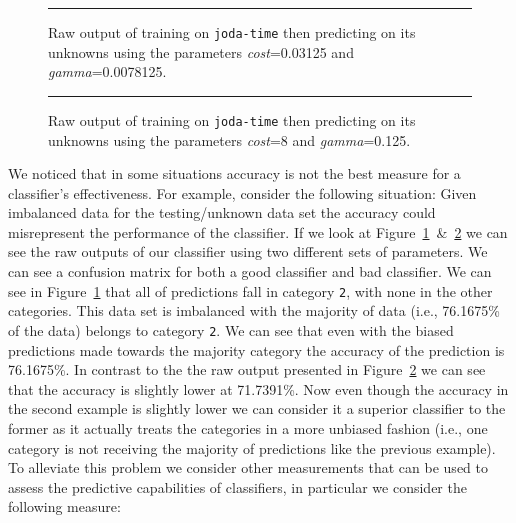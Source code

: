 \begin{landscape}
  \begin{figure}
    \centering
    \begin{minipage}{22.0cm}
    \scriptsize{
    
    }
    \end{minipage}
    \caption{Raw output of training on \texttt{joda-time} then predicting on its unknowns using the parameters \emph{cost}=0.03125 and \emph{gamma}=0.0078125.}
    \vspace{2mm}
    \hrule
    \label{fig:raw_output_bad}
  \end{figure}

  \begin{figure}
    \centering
    \begin{minipage}{22.0cm}
    \scriptsize{
    
    }
    \end{minipage}
    \caption{Raw output of training on \texttt{joda-time} then predicting on its unknowns using the parameters \emph{cost}=8 and \emph{gamma}=0.125.}
    \vspace{2mm}
    \hrule
    \label{fig:raw_output_good}
  \end{figure}
\end{landscape}

We noticed that in some situations accuracy is not the best measure for a classifier's effectiveness. For example, consider the following situation: Given imbalanced data for the testing/unknown data set the accuracy could misrepresent the performance of the classifier. If we look at Figure~\ref{fig:raw_output_bad}~\&~\ref{fig:raw_output_good} we can see the raw outputs of our classifier using two different sets of parameters. We can see a confusion matrix for both a good classifier and bad classifier. We can see in Figure~\ref{fig:raw_output_bad} that all of predictions fall in category \texttt{2}, with none in the other categories. This data set is imbalanced  with the majority of data (i.e., 76.1675\% of the data) belongs to category \texttt{2}. We can see that even with the biased predictions made towards the majority category the accuracy of the prediction is 76.1675\%. In contrast to the the raw output presented in Figure~\ref{fig:raw_output_good} we can see that the accuracy is slightly lower at 71.7391\%. Now even though the accuracy in the second example is slightly lower we can consider it a superior classifier to the former as it actually treats the categories in a more unbiased fashion (i.e., one category is not receiving the majority of predictions like the previous example). To alleviate this problem we consider other measurements that can be used to assess the predictive capabilities of classifiers, in particular we consider the following measure:

